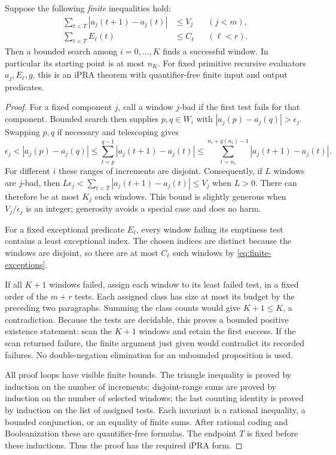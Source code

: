 \begin{theorem}
\label{thm:common-window}
Suppose the following \emph{finite} inequalities hold:
\begin{align}
 \sum_{t<T}|a_j(t+1)-a_j(t)|&\leq V_j &&(j<m),\label{eq:finite-variation}\\
 \sum_{t<T} E_\ell(t)&\leq C_\ell &&(\ell<r).
 \label{eq:finite-exceptions}
\end{align}
Then a bounded search among $i=0,\ldots,K$ finds a successful window.
In particular its starting point is at most $n_K$. For fixed primitive
recursive evaluators $a_j,E_\ell,g$, this is an iPRA theorem with
quantifier-free finite input and output predicates.
\end{theorem}

\begin{proof}
For a fixed component $j$, call a window $j$-bad if the first test fails
for that component. Bounded search then supplies $p,q\in W_i$ with
$|a_j(p)-a_j(q)|>\epsilon_j$. Swapping $p,q$ if necessary and telescoping
gives
\[
 \epsilon_j<|a_j(p)-a_j(q)|
 \leq\sum_{t=p}^{q-1}|a_j(t+1)-a_j(t)|
 \leq\sum_{t=n_i}^{n_i+g(n_i)-1}|a_j(t+1)-a_j(t)|.
\]
For different $i$ these ranges of increments are disjoint. Consequently,
if $L$ windows are $j$-bad, then
$L\epsilon_j<\sum_{t<T}|a_j(t+1)-a_j(t)|\leq V_j$ when $L>0$.
There can therefore be at most $K_j$ such windows. This bound is slightly
generous when $V_j/\epsilon_j$ is an integer; generosity avoids a special
case and does no harm.

For a fixed exceptional predicate $E_\ell$, every window failing its
emptiness test contains a least exceptional index. The chosen indices
are distinct because the windows are disjoint, so there are at most
$C_\ell$ such windows by \eqref{eq:finite-exceptions}.

If all $K+1$ windows failed, assign each window to its least failed test,
in a fixed order of the $m+r$ tests. Each assigned class has size at most
its budget by the preceding two paragraphs. Summing the class counts
would give $K+1\leq K$, a contradiction. Because the tests are decidable,
this proves a bounded positive existence statement: scan the $K+1$
windows and retain the first success. If the scan returned failure,
the finite argument just given would contradict its recorded failures.
No double-negation elimination for an unbounded proposition is used.

All proof loops have visible finite bounds. The triangle inequality is
proved by induction on the number of increments; disjoint-range sums are
proved by induction on the number of selected windows; the last counting
identity is proved by induction on the list of assigned tests. Each
invariant is a rational inequality, a bounded conjunction, or an equality
of finite sums. After rational coding and Booleanization these are
quantifier-free formulas. The endpoint $T$ is fixed before these
inductions. Thus the proof has the required iPRA form.
\end{proof}

